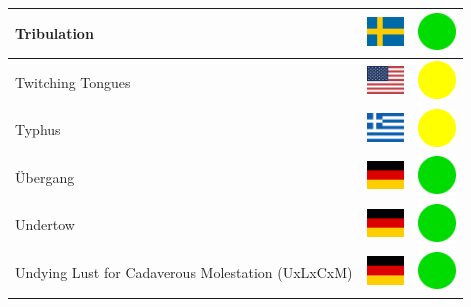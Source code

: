 \documentclass[12pt, a4paper, twoside]{report}
\begin{document}
\begin{center}
\begin{longtable}{|p{5cm}|p{2cm}|p{2cm}|}
Tribulation & \includegraphics[width=1cm]{4x3/se} & \includegraphics[width=1cm]{likes/y} \\ \hline
Twitching Tongues & \includegraphics[width=1cm]{4x3/us} & \includegraphics[width=1cm]{likes/m} \\ \hline
Typhus & \includegraphics[width=1cm]{4x3/gr} & \includegraphics[width=1cm]{likes/m} \\ \hline
Übergang & \includegraphics[width=1cm]{4x3/de} & \includegraphics[width=1cm]{likes/y} \\ \hline
Undertow & \includegraphics[width=1cm]{4x3/de} & \includegraphics[width=1cm]{likes/y} \\ \hline
Undying Lust for Cadaverous Molestation (UxLxCxM) & \includegraphics[width=1cm]{4x3/de} & \includegraphics[width=1cm]{likes/y} \\ \hline

\end{longtable}
\end{center}
\end{document}
